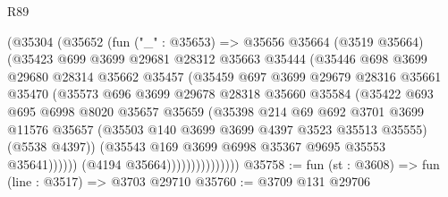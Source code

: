 \begin{lexlean}{R89}
\begin{coremodule}
                          (@35304
                            (@35652
                              (fun ("_" : @35653) =>
                              @35656
                                @35664
                                (@3519 @35664)
                                (@35423
                                  @699
                                  @3699
                                  @29681
                                  @28312
                                  @35663
                                  @35444
                                  (@35446
                                    @698
                                    @3699
                                    @29680
                                    @28314
                                    @35662
                                    @35457
                                    (@35459
                                      @697
                                      @3699
                                      @29679
                                      @28316
                                      @35661
                                      @35470
                                      (@35573
                                        @696
                                        @3699
                                        @29678
                                        @28318
                                        @35660
                                        @35584
                                        (@35422
                                          @693
                                          @695
                                          @6998
                                          @8020
                                          @35657
                                          @35659
                                          (@35398
                                            @214
                                            @69
                                            @692
                                            @3701
                                            @3699
                                            @11576
                                            @35657
                                            (@35503 @140 @3699 @3699 @4397 @3523 @35513 @35555)
                                            (@5538 @4397))
                                          (@35543 @169 @3699 @6998 @35367 @9695 @35553 @35641))))))
                                (@4194 @35664)))))))))))))))
@35758 := fun (st : @3608) => fun (line : @3517) => @3703 @29710
@35760 := @3709 @131 @29706

\end{coremodule}
\end{lexlean}
